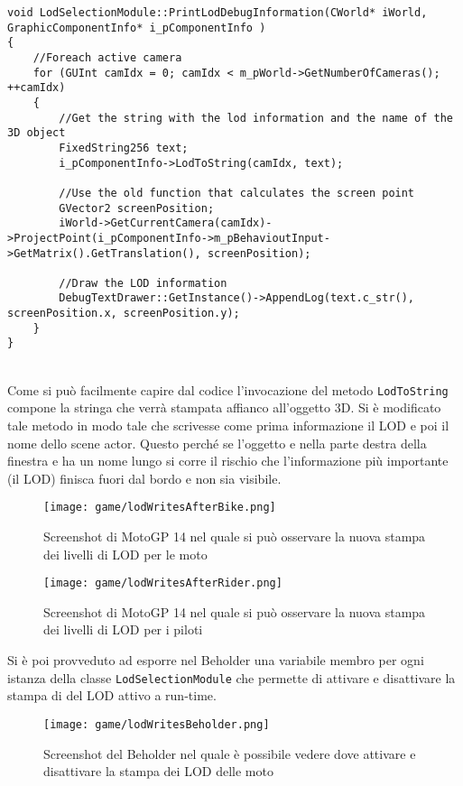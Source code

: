 \begin{lstlisting}[style=maurizio-code]
void LodSelectionModule::PrintLodDebugInformation(CWorld* iWorld, GraphicComponentInfo* i_pComponentInfo )
{
	//Foreach active camera
	for (GUInt camIdx = 0; camIdx < m_pWorld->GetNumberOfCameras(); ++camIdx)
	{
		//Get the string with the lod information and the name of the 3D object
		FixedString256 text;
		i_pComponentInfo->LodToString(camIdx, text);
		
		//Use the old function that calculates the screen point
		GVector2 screenPosition;
		iWorld->GetCurrentCamera(camIdx)->ProjectPoint(i_pComponentInfo->m_pBehavioutInput->GetMatrix().GetTranslation(), screenPosition);
		
		//Draw the LOD information
		DebugTextDrawer::GetInstance()->AppendLog(text.c_str(), screenPosition.x, screenPosition.y);
	}
}
\end{lstlisting}
~\\
Come si può facilmente capire dal codice l'invocazione del metodo \texttt{LodToString} compone la stringa che verrà stampata affianco all'oggetto 3D. Si è modificato tale metodo in modo tale che scrivesse come prima informazione il LOD e poi il nome dello scene actor. Questo perché se l'oggetto e nella parte destra della finestra e ha un nome lungo si corre il rischio che l'informazione più importante (il LOD) finisca fuori dal bordo e non sia visibile.

\begin{figure}[h!] 
	\centering 
	\hspace*{-0.05\columnwidth}\texttt{[image: game/lodWritesAfterBike.png]} 
	\caption{Screenshot di MotoGP 14 nel quale si può osservare la nuova stampa dei livelli di LOD per le moto}
\end{figure}

\begin{figure}[h!] 
	\centering 
	\hspace*{-0.05\columnwidth}\texttt{[image: game/lodWritesAfterRider.png]} 
	\caption{Screenshot di MotoGP 14 nel quale si può osservare la nuova stampa dei livelli di LOD per i piloti}
\end{figure}

Si è poi provveduto ad esporre nel Beholder una variabile membro per ogni istanza della classe \texttt{LodSelectionModule} che permette di attivare e disattivare la stampa di del LOD attivo a run-time.\\

\begin{figure}[h!] 
	\centering 
	\hspace*{-0.05\columnwidth}\texttt{[image: game/lodWritesBeholder.png]} 
	\caption{Screenshot del Beholder nel quale è possibile vedere dove attivare e disattivare la stampa dei LOD delle moto}
\end{figure}

